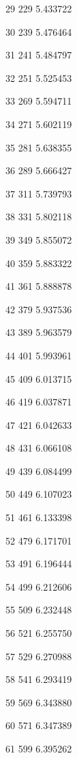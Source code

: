 \documentclass[12pt]{article}
\begin{document}
29 \textbar{} 229 \textbar{} 5.433722

30 \textbar{} 239 \textbar{} 5.476464

31 \textbar{} 241 \textbar{} 5.484797

32 \textbar{} 251 \textbar{} 5.525453

33 \textbar{} 269 \textbar{} 5.594711

34 \textbar{} 271 \textbar{} 5.602119

35 \textbar{} 281 \textbar{} 5.638355

36 \textbar{} 289 \textbar{} 5.666427

37 \textbar{} 311 \textbar{} 5.739793

38 \textbar{} 331 \textbar{} 5.802118

39 \textbar{} 349 \textbar{} 5.855072

40 \textbar{} 359 \textbar{} 5.883322

41 \textbar{} 361 \textbar{} 5.888878

42 \textbar{} 379 \textbar{} 5.937536

43 \textbar{} 389 \textbar{} 5.963579

44 \textbar{} 401 \textbar{} 5.993961

45 \textbar{} 409 \textbar{} 6.013715

46 \textbar{} 419 \textbar{} 6.037871

47 \textbar{} 421 \textbar{} 6.042633

48 \textbar{} 431 \textbar{} 6.066108

49 \textbar{} 439 \textbar{} 6.084499

50 \textbar{} 449 \textbar{} 6.107023

51 \textbar{} 461 \textbar{} 6.133398

52 \textbar{} 479 \textbar{} 6.171701

53 \textbar{} 491 \textbar{} 6.196444

54 \textbar{} 499 \textbar{} 6.212606

55 \textbar{} 509 \textbar{} 6.232448

56 \textbar{} 521 \textbar{} 6.255750

57 \textbar{} 529 \textbar{} 6.270988

58 \textbar{} 541 \textbar{} 6.293419

59 \textbar{} 569 \textbar{} 6.343880

60 \textbar{} 571 \textbar{} 6.347389

61 \textbar{} 599 \textbar{} 6.395262
\end{document}
